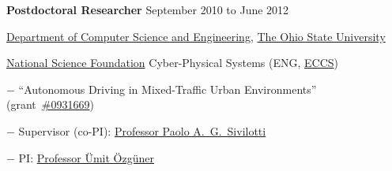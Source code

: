 \halfblankline

\textbf{Postdoctoral Researcher} \hfill {September 2010 to June 2012}
\begin{innerlist}

    \item[] \href{http://www.cse.ohio-state.edu/}{Department of Computer Science and Engineering},
            \href{http://www.osu.edu/}{The Ohio State University}
    \begin{innerlist}
        \item \href{http://www.nfs.gov/}{National Science Foundation} Cyber-Physical Systems (ENG, \href{http://www.nsf.gov/div/index.jsp?div=eccs}{ECCS})
        \begin{innerlist}
            \item[$-$] ``Autonomous Driving in Mixed-Traffic Urban Environments''
                (grant~\href{http://www.nsf.gov/awardsearch/showAward.do?AwardNumber=0931669}{\#0931669})
            \item[$-$] Supervisor (co-PI):
                \href{http://www.cse.ohio-state.edu/~paolo/}%
                     {Professor Paolo A.~G.~Sivilotti}
            \item[$-$] PI:
                \href{http://www.ece.ohio-state.edu/~umit/}%
                     {Professor \"{U}mit \"{O}zg\"{u}ner}
        \end{innerlist}
    \end{innerlist}

\end{innerlist}